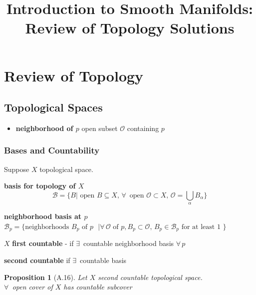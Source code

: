 \documentclass[11pt]{amsart}
\title{Introduction to Smooth Manifolds: Review of Topology Solutions}
\newtheorem{proposition}{Proposition}
\theoremstyle{definition}
\begin{document}
\maketitle
\section{Review of Topology}

\subsection*{Topological Spaces}

\begin{itemize}
  \item \textbf{neighborhood of $p$} open subset $\mathcal{O}$ containing $p$
\end{itemize}



\subsubsection*{Bases and Countability}

Suppose $X$ topological space.

\textbf{basis for topology of $X$ } \[
\mathcal{B} = \lbrace B | \text{ open } B \subseteq X, \, \forall \,  \text{ open } \mathcal{O} \subset X, \, \mathcal{O} = \bigcup_{\alpha} B_{\alpha} \rbrace
\]

\textbf{neighborhood basis at $p$ } $\mathcal{B}_p = \lbrace \text{neighborhoods } B_p \text{ of $p$ } | \forall \, \mathcal{O} \text{ of } p,  B_p \subset \mathcal{O}, \, B_p \in \mathcal{B}_p \text{ for at least 1 } \rbrace$

$X$ \textbf{first countable }- if $\exists \, $ countable neighborhood basis $\forall \, p$

\textbf{second countable } if $\exists \, $ countable basis

\begin{proposition}[A.16]  Let $X$ second countable topological space. \\
$\forall \, $ open cover of $X$ has countable subcover
\end{proposition}
\end{document}
